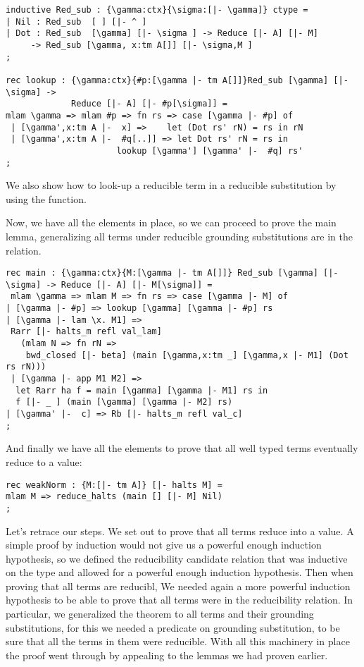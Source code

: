 \begin{lstlisting}
inductive Red_sub : {\gamma:ctx}{\sigma:[|- \gamma]} ctype =
| Nil : Red_sub  [ ] [|- ^ ]
| Dot : Red_sub  [\gamma] [|- \sigma ] -> Reduce [|- A] [|- M]
     -> Red_sub [\gamma, x:tm A[]] [|- \sigma,M ]
;

rec lookup : {\gamma:ctx}{#p:[\gamma |- tm A[]]}Red_sub [\gamma] [|- \sigma] ->
             Reduce [|- A] [|- #p[\sigma]] =
mlam \gamma => mlam #p => fn rs => case [\gamma |- #p] of
 | [\gamma',x:tm A |-  x] =>    let (Dot rs' rN) = rs in rN
 | [\gamma',x:tm A |-  #q[..]] => let Dot rs' rN = rs in
                      lookup [\gamma'] [\gamma' |-  #q] rs'
;
\end{lstlisting}

We also show how to look-up a reducible term in a reducible
substitution by using the  function.

Now, we have all the elements in place, so we can proceed to prove the
main lemma, generalizing all terms under reducible grounding substitutions are
in the  relation.
\begin{lstlisting}
rec main : {\gamma:ctx}{M:[\gamma |- tm A[]]} Red_sub [\gamma] [|- \sigma] -> Reduce [|- A] [|- M[\sigma]] =
 mlam \gamma => mlam M => fn rs => case [\gamma |- M] of
| [\gamma |- #p] => lookup [\gamma] [\gamma |- #p] rs
| [\gamma |- lam \x. M1] =>
 Rarr [|- halts_m refl val_lam]
   (mlam N => fn rN =>
    bwd_closed [|- beta] (main [\gamma,x:tm _] [\gamma,x |- M1] (Dot rs rN)))
 | [\gamma |- app M1 M2] =>
  let Rarr ha f = main [\gamma] [\gamma |- M1] rs in
  f [|- _ ] (main [\gamma] [\gamma |- M2] rs)
| [\gamma' |-  c] => Rb [|- halts_m refl val_c]
;
\end{lstlisting}

And finally we have all the elements to prove that all well typed
terms eventually reduce to a value:
\begin{lstlisting}
rec weakNorm : {M:[|- tm A]} [|- halts M] =
mlam M => reduce_halts (main [] [|- M] Nil)
;
\end{lstlisting}

Let's retrace our steps. We set out to prove that all terms reduce into a
value. A simple proof by induction would not give us a powerful enough
induction hypothesis, so we defined the reducibility candidate
relation that was inductive on the type and allowed for a powerful enough
induction hypothesis. Then when proving that all terms are reducibl, We needed again a more powerful induction
hypothesis to be able to prove that all terms were in the reducibility
relation. In particular, we generalized the theorem to all terms and
their grounding substitutions, for this we needed a predicate on
grounding substitution, to be sure that all the terms in them were
reducible. With all this machinery in place the proof went through by
appealing to the lemmas we had proven earlier.

